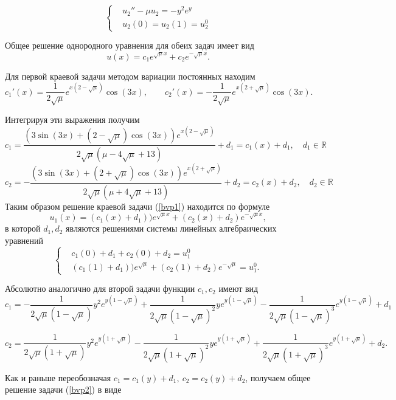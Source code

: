 \documentclass[11pt]{article}
\begin{document}
\begin{equation}
\left\{
	\begin{aligned}
	& u_2''-\mu u_2 = -y^2 e^y \label{bvp2} \\
	& u_2(0) = u_2(1) = u_2^0 
	\end{aligned}	
\right.
\end{equation}

Общее решение однородного уравнения для обеих задач имеет вид
$$u(x) = c_1 e^{\sqrt{\mu}x} + c_2 e^{-\sqrt{\mu}x}.$$

Для первой краевой задачи методом вариации постоянных находим
$$c_1'(x) = \frac{1}{2\sqrt{\mu}}e^{x\left(2-\sqrt{\mu}\right)}\cos(3x), \qquad
c_2'(x) = -\frac{1}{2\sqrt{\mu}}e^{x\left(2+\sqrt{\mu}\right)}\cos(3x).$$

Интегрируя эти выражения получим 
$$c_1 = \frac{\left(3\sin\left(3x\right)+\left(2-\sqrt{\mu}\right)\cos\left(3x\right)\right)e^{x\left(2-\sqrt{\mu}\right)}}{2\sqrt{\mu}
\left(\mu-4\sqrt{\mu}+13\right)} + d_1 = c_1(x) + d_1, \quad d_1 \in \mathbb{R}$$
$$c_2 = -\frac{\left(3\sin\left(3x\right)+\left(2+\sqrt{\mu}\right)\cos\left(3x\right)\right)e^{x\left(2+\sqrt{\mu}\right)}}{2\sqrt{\mu}
\left(\mu+4\sqrt{\mu}+13\right)} + d_2 = c_2(x) + d_2, \quad d_2 \in \mathbb{R}$$
Таким образом решение краевой задачи (\ref{bvp1}) находится по формуле
$$u_1(x) = (c_1(x) + d_1))e^{\sqrt{\mu}x} + (c_2(x) + d_2) e^{-\sqrt{\mu}x},$$
в которой $d_1, d_2$ являются решениями системы линейных алгебраических уравнений
\[
\left\{
	\begin{aligned}
	& c_1(0) + d_1 + c_2(0) + d_2 = u_1^0 \\
	& (c_1(1) + d_1))e^{\sqrt{\mu}} + (c_2(1) + d_2) e^{-\sqrt{\mu}} = u_1^0.
	\end{aligned}	
\right.
\]

Абсолютно аналогично для второй задачи функции $c_1, c_2$ имеют вид
$$c_1 = -\frac{1}{2\sqrt{\mu}\left(1-\sqrt{\mu}\right)}y^2e^{y\left(1-\sqrt{\mu}\right)} 
+\frac{1}{2\sqrt{\mu}\left(1-\sqrt{\mu}\right)^2}ye^{y\left(1-\sqrt{\mu}\right)}
-\frac{1}{2\sqrt{\mu}\left(1-\sqrt{\mu}\right)^3}e^{y\left(1-\sqrt{\mu}\right)}+d_1$$

$$c_2 = \frac{1}{2\sqrt{\mu}\left(1+\sqrt{\mu}\right)}y^2e^{y\left(1+\sqrt{\mu}\right)} 
-\frac{1}{2\sqrt{\mu}\left(1+\sqrt{\mu}\right)^2}ye^{y\left(1+\sqrt{\mu}\right)}
+\frac{1}{2\sqrt{\mu}\left(1+\sqrt{\mu}\right)^3}e^{y\left(1+\sqrt{\mu}\right)}+d_2.$$

Как и раньше переобозначая $c_1 = c_1(y) + d_1, \ c_2 = c_2(y) + d_2$, получаем общее решение задачи (\ref{bvp2}) в виде
\end{document}
